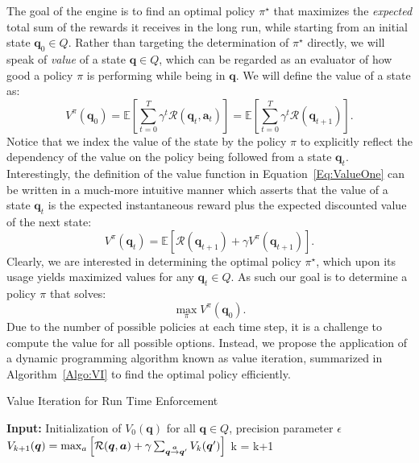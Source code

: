The goal of the engine is to find an optimal policy $\pi^{\star}$ that maximizes the \emph{expected} total sum of the rewards it receives in the long run, while starting from an initial state $\bm{q}_{0} \in Q$. Rather than targeting the determination of $\pi^{\star}$ directly, we will speak of \emph{value} of a state $\bm{q} \in Q$, which can be regarded as an evaluator of how good a policy $\pi$ is performing while being in $\bm{q}$. We will define the value of a state as:
\begin{equation}
\label{Eq:ValueOne}
V^{\pi}(\bm{q}_{0}) = \mathbb{E} \left[\sum_{t=0}^{T} \gamma^{t}\mathcal{R}(\bm{q}_{t},\bm{a}_{t})\right]= \mathbb{E} \left[\sum_{t=0}^{T} \gamma^{t}\mathcal{R}(\bm{q}_{t+1})\right].
\end{equation}
Notice that we index the value of the state by the policy $\pi$ to explicitly reflect the dependency of the value on the policy being followed from a state $\bm{q}_{t}$. Interestingly, the definition of the value function in Equation~\ref{Eq:ValueOne} can be written in a much-more intuitive manner which asserts that the value of a state $\bm{q}_{t}$ is the expected instantaneous reward plus the expected discounted value of the next state: 
\begin{equation*}
V^{\pi}(\bm{q}_{t}) = \mathbb{E}\left[\mathcal{R} \left(\bm{q}_{t+1}\right) + \gamma V^{\pi}\left(\bm{q}_{t+1}\right)\right]. 
\end{equation*}
Clearly, we are interested in determining the optimal policy $\pi^{\star}$, which upon its usage yields maximized values for any $\bm{q}_{t} \in Q$. As such our goal is to determine a policy $\pi$ that solves:
\begin{equation*}
\max_{\pi} V^{\pi}(\bm{q}_{0}). 
\end{equation*}
Due to the number of possible policies at each time step, it is a challenge to compute the value for all possible options. Instead, we propose the application of a dynamic programming algorithm known as value iteration, summarized in Algorithm~\ref{Algo:VI} to find the optimal policy efficiently. 
\begin{algorithm}[h!]
\caption{Value Iteration for Run Time Enforcement}
\label{Algo:VI}
\begin{algorithmic}[1]
\STATE \textbf{Input:} Initialization of $V_{0}(\bm{q})$ for all $\bm{q}\in Q$, precision parameter $\epsilon$
			\STATE $V_{k+1}(\bm{q}) = \max_{a} \left[\mathcal{R}(\bm{q}, \bm{a}) + \gamma \sum_{\bm{q} \goesto[\bm{a}]\bm{q}^{\prime}}V_{k}(\bm{q}^{\prime})\right]$
		\ENDFOR
	\ENDFOR
		\STATE k = k+1
\ENDWHILE
\end{algorithmic}
\end{algorithm}

